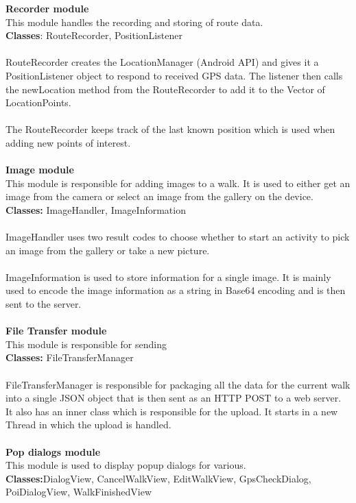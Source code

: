 \documentclass[12pt]{article}
\begin{document}
\textbf{Recorder module}~\\
This module handles the recording and storing of route data.~\\
\textbf{Classes}: RouteRecorder, PositionListener~\\\\
RouteRecorder creates the LocationManager (Android API) and gives it a PositionListener object to respond to received GPS data. The listener then calls the newLocation method from the RouteRecorder to add it to the Vector of LocationPoints.~\\\\
The RouteRecorder keeps track of the last known position which is used when adding new points of interest. 
~\\\\
\textbf{Image module}~\\
This module is responsible for adding images to a walk. It is used to either get an image from the camera or select an image from the gallery on the device. ~\\
\textbf{Classes:} ImageHandler, ImageInformation
~\\\\ImageHandler uses two result codes to choose whether to start an activity to pick an image from the gallery or take a new picture.~\\\\
ImageInformation is used to store information for a single image. It is mainly used to encode the image information as a string in Base64 encoding and is then sent to the server.~\\\\
\textbf{File Transfer module}~\\
This module is responsible for sending~\\
\textbf{Classes:} FileTransferManager ~\\\\
FileTransferManager is responsible for packaging all the data for the current walk into a single JSON object that is then sent as an HTTP POST to a web server. It also has an inner class which is responsible for the upload. It starts in a new Thread in which the upload is handled.~\\\\
\textbf{Pop dialogs module}~\\
This module is used to display popup dialogs for various.~\\ 
\textbf{Classes:}DialogView, CancelWalkView, EditWalkView, GpsCheckDialog, PoiDialogView, WalkFinishedView~\\
\end{document}
